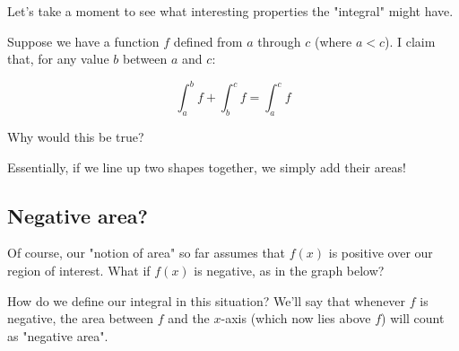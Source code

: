 \documentclass{article}
\begin{document}
Let's take a moment to see what interesting properties the "integral" might have.


Suppose we have a function $f$ defined from $a$ through $c$ (where $a < c$). I claim that, for any value $b$ between $a$ and $c$:

\begin{equation}
\int_{a}^{b} f + \int_{b}^{c} f = \int_{a}^{c} f
\end{equation}

Why would this be true?


Essentially, if we line up two shapes together, we simply add their areas!









\subsection{Negative area?}

Of course, our "notion of area" so far assumes that $f(x)$ is positive over our region of interest. What if $f(x)$ is negative, as in the graph below? 


How do we define our integral in this situation? We'll say that whenever $f$ is negative, the area between $f$ and the $x$-axis (which now lies above $f$) will count as "negative area".


\end{document}
